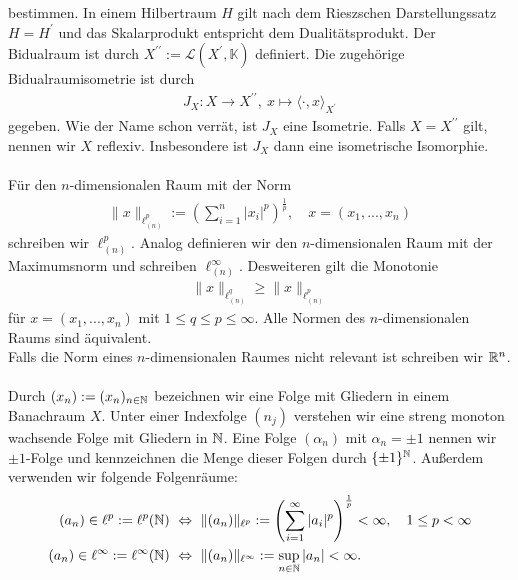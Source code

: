 bestimmen. 
In einem Hilbertraum $ H $ gilt nach dem Rieszschen Darstellungssatz\cite[Kapitel 4]{Alt2012} $ H = H^\prime $  
und das Skalarprodukt entspricht dem Dualitätsprodukt.
Der Bidualraum ist durch $ X^{\prime \prime} := \mathcal{L}(X^\prime, \mathbb{K}) $ definiert.
Die zugehörige Bidualraumisometrie ist durch
\begin{align*}
	J_X: X \to X^{\prime \prime}, \
	x \mapsto \langle \cdot, x \rangle_{X^\prime }
\end{align*}
gegeben\cite[Abschnitt 6.2]{Alt2012}.
Wie der Name schon verrät, ist $ J_X $ eine Isometrie.
Falls $ X = X^{\prime \prime} $ gilt, nennen wir $ X $ reflexiv. Insbesondere ist $ J_X $ dann eine isometrische Isomorphie.
\\
\\
Für den $ n $-dimensionalen Raum mit der Norm 
\begin{align*}
	\| x \|_{\ell^p_{(n)}} := \left(
	\sum \limits_{ i = 1}^n |x_i|^p
	\right)^\frac{1}{p}, \quad x = (x_1,...,x_n)
\end{align*}
schreiben wir $ \ell^p_{(n)} $.
Analog definieren wir den $ n $-dimensionalen Raum mit der Maximumsnorm und schreiben $ \ell^\infty_{(n)} $.
Desweiteren gilt die Monotonie
\begin{align*}
	\| x \|_{\ell^q_{(n)}} \geq \| x\|_{\ell^p_{(n)}}
\end{align*}
für $ x = (x_1,...,x_n) $ mit $ 1 \leq q \leq p \leq \infty $\cite{Alt2012}.
Alle Normen des $ n $-dimensionalen Raums sind äquivalent.\\
Falls die Norm eines $ n $-dimensionalen Raumes nicht relevant ist schreiben wir $ \mathbb{R}^n $.\\
\\
Durch $ (x_n)  := (x_n)_{n \in \mathbb{N}}$ bezeichnen wir eine Folge mit Gliedern in einem Banachraum $ X $. 
Unter einer Indexfolge $ (n_j) $ verstehen wir eine streng monoton wachsende Folge mit Gliedern in $ \mathbb{N} $.
Eine Folge $ (\alpha_n) $ mit $ \alpha_n = \pm 1 $ nennen wir $ \pm 1 $-Folge und kennzeichnen die Menge dieser Folgen durch $ \{\pm 1\}^{\mathbb{N}} $. 
Außerdem verwenden wir folgende Folgenräume:
\begin{align*}
	(a_n) \in \ell^p := \ell^p(\mathbb{N})  \ &\Leftrightarrow \ \|(a_n)\|_{\ell^p} := \left(\sum \limits_{i = 1}^{\infty} |a_i|^p\right)^\frac{1}{p} < \infty, \quad 1 \leq p < \infty\\
	(a_n) \in \ell^\infty := \ell^\infty(\mathbb{N})  \ &\Leftrightarrow \ \|(a_n)\|_{\ell^\infty} := \sup \limits_{n \in \mathbb{N}} |a_n| < \infty. 
\end{align*}
